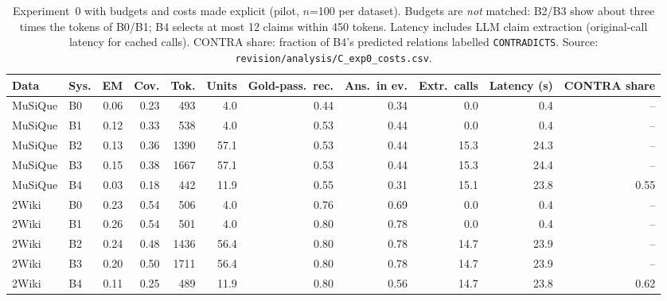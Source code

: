 \begin{table}[t]
\centering
\footnotesize
\begin{adjustbox}{max width=\linewidth}
\begin{tabular}{@{}llrrrrrrrrr@{}}
\toprule
Data & Sys. & EM & Cov. & Tok. & Units & Gold-pass.\ rec. & Ans.\ in ev. & Extr.\ calls & Latency (s) & CONTRA share \\
\midrule
MuSiQue & B0 & 0.06 & 0.23 & 493 & 4.0 & 0.44 & 0.34 & 0.0 & 0.4 & -- \\
MuSiQue & B1 & 0.12 & 0.33 & 538 & 4.0 & 0.53 & 0.44 & 0.0 & 0.4 & -- \\
MuSiQue & B2 & 0.13 & 0.36 & 1390 & 57.1 & 0.53 & 0.44 & 15.3 & 24.3 & -- \\
MuSiQue & B3 & 0.15 & 0.38 & 1667 & 57.1 & 0.53 & 0.44 & 15.3 & 24.4 & -- \\
MuSiQue & B4 & 0.03 & 0.18 & 442 & 11.9 & 0.55 & 0.31 & 15.1 & 23.8 & 0.55 \\
\midrule
2Wiki & B0 & 0.23 & 0.54 & 506 & 4.0 & 0.76 & 0.69 & 0.0 & 0.4 & -- \\
2Wiki & B1 & 0.26 & 0.54 & 501 & 4.0 & 0.80 & 0.78 & 0.0 & 0.4 & -- \\
2Wiki & B2 & 0.24 & 0.48 & 1436 & 56.4 & 0.80 & 0.78 & 14.7 & 23.9 & -- \\
2Wiki & B3 & 0.20 & 0.50 & 1711 & 56.4 & 0.80 & 0.78 & 14.7 & 23.9 & -- \\
2Wiki & B4 & 0.11 & 0.25 & 489 & 11.9 & 0.80 & 0.56 & 14.7 & 23.8 & 0.62 \\
\bottomrule
\end{tabular}
\end{adjustbox}
\caption{Experiment~0 with budgets and costs made explicit (pilot, $n$=100 per dataset). Budgets are \emph{not} matched: B2/B3 show about three times the tokens of B0/B1; B4 selects at most 12 claims within 450 tokens. Latency includes LLM claim extraction (original-call latency for cached calls). CONTRA share: fraction of B4's predicted relations labelled \texttt{CONTRADICTS}. Source: \texttt{revision/\allowbreak analysis/\allowbreak C\_exp0\_costs.csv}.}
\label{tab:exp0-costs}
\end{table}
